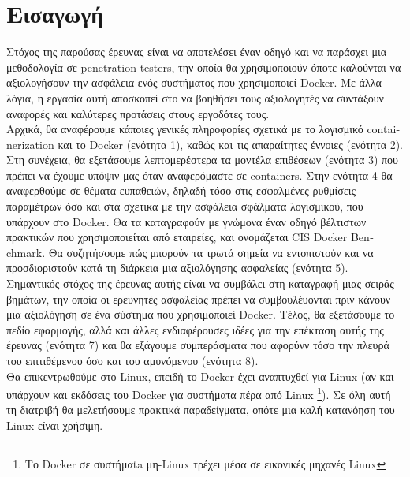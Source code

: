 \section{Εισαγωγή}
\label{introduction}


Στόχος της παρούσας έρευνας είναι να αποτελέσει έναν οδηγό και να παράσχει
μια μεθοδολογία σε \textlatin{penetration testers}, την οποία θα χρησιμοποιούν
όποτε καλούνται να αξιολογήσουν την ασφάλεια ενός συστήματος που χρησιμοποιεί
\textlatin{Docker}. Με άλλα λόγια, η εργασία αυτή αποσκοπεί στο να βοηθήσει τους
αξιολογητές να συντάξουν αναφορές και καλύτερες προτάσεις στους
εργοδότες τους.\mbox{} \\

Αρχικά, θα αναφέρουμε κάποιες γενικές
πληροφορίες σχετικά με το λογισμικό \textlatin{containerization} και το
\textlatin{Docker} (ενότητα 1), καθώς και τις απαραίτητες έννοιες (ενότητα 2).
Στη συνέχεια, θα εξετάσουμε λεπτομερέστερα
τα μοντέλα επιθέσεων (ενότητα 3) που πρέπει να έχουμε υπόψιν μας όταν
αναφερόμαστε σε \textlatin{containers}.
Στην ενότητα 4 θα αναφερθούμε σε θέματα ευπαθειών, δηλαδή τόσο στις εσφαλμένες
ρυθμίσεις παραμέτρων όσο και στα σχετικα με την ασφάλεια
σφάλματα λογισμικού, που υπάρχουν στο \textlatin{Docker}. Θα τα καταγραφούν
με γνώμονα έναν οδηγό βέλτιστων πρακτικών που
χρησιμοποιείται από εταιρείες, και ονομάζεται
\textlatin{CIS Docker Benchmark}. 
Θα συζητήσουμε πώς μπορούν τα τρωτά σημεία να εντοπιστούν και να προσδιοριστούν
κατά τη διάρκεια μια αξιολόγησης ασφαλείας (ενότητα 5). Σημαντικός στόχος της
έρευνας αυτής είναι να συμβάλει στη καταγραφή μιας σειράς βημάτων, την οποία
οι ερευνητές ασφαλείας πρέπει να συμβουλέυονται πριν κάνουν μια αξιολόγηση σε
ένα σύστημα που χρησιμοποιεί \textlatin{Docker}. Τέλος, θα εξετάσουμε το πεδίο
εφαρμογής, αλλά και άλλες ενδιαφέρουσες ιδέες για την επέκταση αυτής της
έρευνας (ενότητα 7) και θα εξάγουμε συμπεράσματα που αφορύνν τόσο την πλευρά του
επιτιθέμενου όσο και του αμυνόμενου  (ενότητα 8).\mbox{} \\

Θα επικεντρωθούμε στο \textlatin{Linux}, επειδή το \textlatin{Docker} έχει αναπτυχθεί για
\textlatin{Linux} (αν και υπάρχουν και εκδόσεις του \textlatin{Docker} για συστήματα πέρα από \textlatin{Linux} \footnote{Το \textlatin{Docker} σε συστήμαta μη-\textlatin{Linux} τρέχει μέσα σε εικονικές μηχανές \textlatin{Linux}}).
Σε όλη αυτή τη διατριβή θα μελετήσουμε πρακτικά παραδείγματα, οπότε μια καλή
κατανόηση του \textlatin{Linux} είναι χρήσιμη.
